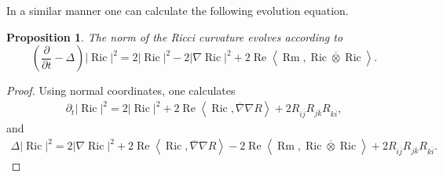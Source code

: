 \documentclass[12pt]{article}
\newtheorem{proposition}[theorem]{Proposition}
\numberwithin{equation}{section}
\renewcommand{\d}{\partial}
\DeclareMathOperator{\Ric}{Ric}
\DeclareMathOperator{\Rm}{Rm}
\DeclareMathOperator{\Real}{Re}
\newcommand{\oo}[1]{\overline{#1}}
\newcommand{\parabolic}[1]{\left(\frac{\d}{\d t} - \Delta_{#1}\right)}
\newcommand{\ip}[1]{\left\langle#1\right\rangle}
\begin{document}
\noindent In a similar manner one can calculate the following evolution equation.

\begin{proposition}
The norm of the Ricci curvature evolves according to
\begin{equation}\label{Ricci_norm_evolution}
    \parabolic{} |\Ric|^2 = 2|\Ric|^2-2|\nabla \Ric|^2 +2\Real \ip{\Rm, \oo{\Ric \otimes \Ric}}.
\end{equation}
\end{proposition}

\begin{proof}
Using normal coordinates, one calculates
\begin{align*}
    \d_t |\Ric|^2 = 2|\Ric|^2 + 2\Real \ip{\Ric, \oo{\nabla} \nabla R} + 2R_{i\oo{j}}R_{j\oo{k}}R_{k\oo{i}},
\end{align*}
and
\begin{align*}
    \Delta |\Ric|^2 = 2|\nabla \Ric|^2 + 2\Real \ip{\Ric, \oo{\nabla} \nabla R} - 2\Real \ip{\Rm, \oo{\Ric \otimes \Ric}} + 2R_{i\oo{j}} R_{j\oo{k}} R_{k\oo{i}}.
\end{align*}
\end{proof}
\end{document}
